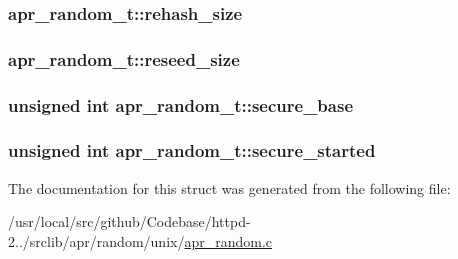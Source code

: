 \subsubsection[{\texorpdfstring{rehash\+\_\+size}{rehash_size}}]{ apr\+\_\+random\+\_\+t\+::rehash\+\_\+size}\hypertarget{structapr__random__t_a31b0c6f16645d75f5c20d3aeffbe7131}{}\label{structapr__random__t_a31b0c6f16645d75f5c20d3aeffbe7131}
\subsubsection[{\texorpdfstring{reseed\+\_\+size}{reseed_size}}]{ apr\+\_\+random\+\_\+t\+::reseed\+\_\+size}\hypertarget{structapr__random__t_a20e8fe5449e31fc9cbb3accad34fd17a}{}\label{structapr__random__t_a20e8fe5449e31fc9cbb3accad34fd17a}
\subsubsection[{\texorpdfstring{secure\+\_\+base}{secure_base}}]{\setlength{\rightskip}{0pt plus 5cm}unsigned {\bf int} apr\+\_\+random\+\_\+t\+::secure\+\_\+base}\hypertarget{structapr__random__t_acc1dd42ed4d75a143121bf6f03a9b0ca}{}\label{structapr__random__t_acc1dd42ed4d75a143121bf6f03a9b0ca}
\subsubsection[{\texorpdfstring{secure\+\_\+started}{secure_started}}]{\setlength{\rightskip}{0pt plus 5cm}unsigned {\bf int} apr\+\_\+random\+\_\+t\+::secure\+\_\+started}\hypertarget{structapr__random__t_a9d3575ecd232732a3cc54c19dc16b84b}{}\label{structapr__random__t_a9d3575ecd232732a3cc54c19dc16b84b}


The documentation for this struct was generated from the following file\+:\begin{DoxyCompactItemize}
\item 
/usr/local/src/github/\+Codebase/httpd-\/2../srclib/apr/random/unix/\hyperlink{apr__random_8c}{apr\+\_\+random.\+c}\end{DoxyCompactItemize}
